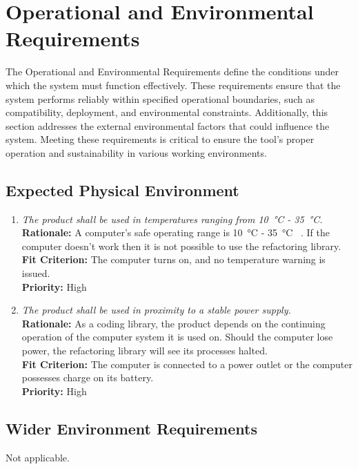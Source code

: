 \documentclass[12pt]{article}
\begin{document}
\section{Operational and Environmental Requirements}

The Operational and Environmental Requirements define the conditions
under which the system must function effectively. These requirements
ensure that the system performs reliably within specified operational
boundaries, such as compatibility, deployment, and environmental
constraints. Additionally, this section addresses the external
environmental factors that could influence the system. Meeting these
requirements is critical to ensure the tool’s proper operation and
sustainability in various working environments.

\subsection{Expected Physical Environment}

\begin{enumerate}[label=OER-EP \arabic*., wide=0pt, leftmargin=*]
  \item \emph{The product shall be used in temperatures ranging from
    \SI{10}{\celsius} - \SI{35}{\celsius}.}\\[2mm]
    {\bf Rationale:} A computer's safe operating range is
    \SI{10}{\celsius} - \SI{35}{\celsius} ~\citep{PCTemp}. If the
    computer doesn't work then it is not possible to use the
    refactoring library. \\
    {\bf Fit Criterion:} The computer turns on, and no temperature
    warning is issued. \\
    {\bf Priority:} High
  \item \emph{The product shall be used in proximity to a stable
    power supply.}\\
    {\bf Rationale:} As a coding library, the product depends on the
    continuing operation of the computer system it is used on. Should
    the computer lose power, the refactoring library will see its
    processes halted. \\
    {\bf Fit Criterion:} The computer is connected to a power outlet
    or the computer possesses charge on its battery. \\
    {\bf Priority:} High
\end{enumerate}

\subsection{Wider Environment Requirements}
Not applicable.
\end{document}
